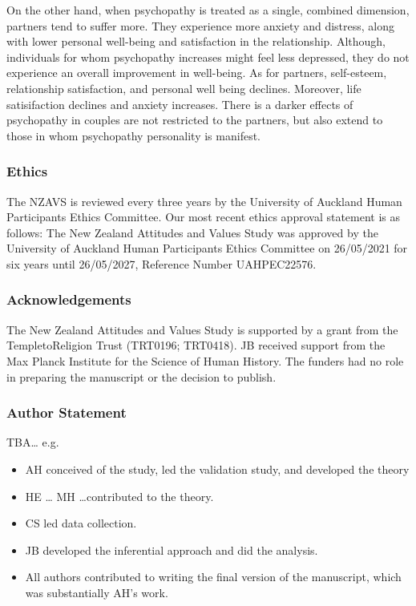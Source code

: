 \documentclass[
  singlecolumn]{article}
\providecommand{\tightlist}{%
  \setlength{\itemsep}{0pt}\setlength{\parskip}{0pt}}\usepackage{longtable,booktabs,array}
\begin{document}
On the other hand, when psychopathy is treated as a single, combined
dimension, partners tend to suffer more. They experience more anxiety
and distress, along with lower personal well-being and satisfaction in
the relationship. Although, individuals for whom psychopathy increases
might feel less depressed, they do not experience an overall improvement
in well-being. As for partners, self-esteem, relationship satisfaction,
and personal well being declines. Moreover, life satisifaction declines
and anxiety increases. There is a darker effects of psychopathy in
couples are not restricted to the partners, but also extend to those in
whom psychopathy personality is manifest.

\newpage{}

\subsubsection{Ethics}\label{ethics}

The NZAVS is reviewed every three years by the University of Auckland
Human Participants Ethics Committee. Our most recent ethics approval
statement is as follows: The New Zealand Attitudes and Values Study was
approved by the University of Auckland Human Participants Ethics
Committee on 26/05/2021 for six years until 26/05/2027, Reference Number
UAHPEC22576.

\subsubsection{Acknowledgements}\label{acknowledgements}

The New Zealand Attitudes and Values Study is supported by a grant from
the TempletoReligion Trust (TRT0196; TRT0418). JB received support from
the Max Planck Institute for the Science of Human History. The funders
had no role in preparing the manuscript or the decision to publish.

\subsubsection{Author Statement}\label{author-statement}

TBA\ldots{} e.g.~

\begin{itemize}
\tightlist
\item
  AH conceived of the study, led the validation study, and developed the
  theory
\item
  HE \ldots{} MH \ldots contributed to the theory.
\item
  CS led data collection.
\item
  JB developed the inferential approach and did the analysis.\\
\item
  All authors contributed to writing the final version of the
  manuscript, which was substantially AH's work.
\end{itemize}
\end{document}
